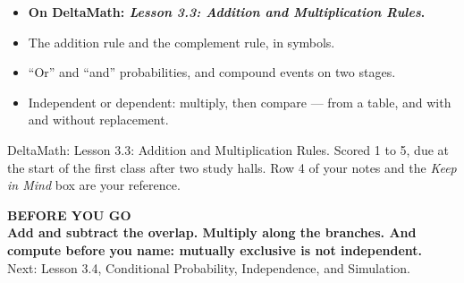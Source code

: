 \documentclass[aspectratio=169, 11pt]{beamer}
\begin{document}
\begin{frame}[t, plain]
  \begin{itemize}\setlength{\itemsep}{5pt}
    \item \textbf{On DeltaMath: \emph{Lesson 3.3: Addition and Multiplication Rules}.}
    \item The addition rule and the complement rule, in symbols.
    \item ``Or'' and ``and'' probabilities, and compound events on two stages.
    \item Independent or dependent: multiply, then compare --- from a table, and with and
          without replacement.
  \end{itemize}
  \begin{block}{DeltaMath: Lesson 3.3: Addition and Multiplication Rules. Scored 1 to 5, due at the start of the first class after two study halls.}
    Row 4 of your notes and the \emph{Keep in Mind} box are your reference.
  \end{block}
\end{frame}

{
\begin{frame}[plain]
  \vspace{1.5cm}\hspace{0.8cm}%
  \begin{minipage}{0.86\textwidth}
    {\color{goldacc}\bfseries\small BEFORE YOU GO}\\[0.7cm]
    {\color{white}\bfseries\Large Add and subtract the overlap. Multiply along the branches.
    And compute before you name: mutually exclusive is not independent.}\\[0.9cm]
    {\color{frostmid}\small Next: Lesson 3.4, Conditional Probability, Independence, and
    Simulation.}
  \end{minipage}
\end{frame}
}
\end{document}
